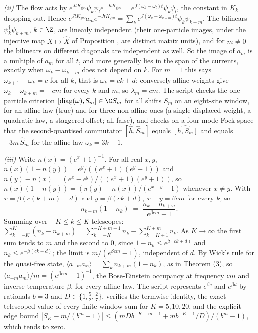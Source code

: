 \emph{(ii)} The flow acts by $e^{JtK_{\mathrm{geo}}}\psi_{k}^{\dagger}\psi_{l}e^{-JtK_{\mathrm{geo}}} = e^{J(\omega_{k} - \omega_{l})t}\psi_{k}^{\dagger}\psi_{l}$, the constant in $K_{k}$ dropping out. Hence $e^{JtK_{\mathrm{geo}}}a_{m}e^{-JtK_{\mathrm{geo}}} = \sum_{k}e^{J(\omega_{k} - \omega_{k+m})t}\psi_{k}^{\dagger}\psi_{k+m}$. The bilinears $\psi_{k}^{\dagger}\psi_{k+m}$, $k \in \Z$, are linearly independent (their one-particle images, under the injective map $X \mapsto \hat{X}$ of Proposition , are distinct matrix units), and for $m \neq 0$ the bilinears on different diagonals are independent as well. So the image of $a_{m}$ is a multiple of $a_{m}$ for all $t$, and more generally lies in the span of the currents, exactly when $\omega_{k} - \omega_{k+m}$ does not depend on $k$. For $m = 1$ this says $\omega_{k+1} - \omega_{k} = c$ for all $k$, that is $\omega_{k} = ck + d$; conversely affine weights give $\omega_{k} - \omega_{k+m} = -cm$ for every $k$ and $m$, so $\lambda_{m} = cm$. The script checks the one-particle criterion $[\operatorname{diag}(\omega), S_{m}] \in \C S_{m}$ for all shifts $S_{m}$ on an eight-site window, for an affine law (true) and for three non-affine ones (a single displaced weight, a quadratic law, a staggered offset; all false), and checks on a four-mode Fock space that the second-quantised commutator $[\hat{h}, \hat{S}_{m}]$ equals $\widehat{[h, S_{m}]}$ and equals $-3m\,\hat{S}_{m}$ for the affine law $\omega_{k} = 3k - 1$.

\emph{(iii)} Write $n(x) = (e^{x} + 1)^{-1}$. For all real $x, y$, $n(x)(1 - n(y)) = e^{y}/((e^{x} + 1)(e^{y} + 1))$ and $n(y) - n(x) = (e^{x} - e^{y})/((e^{x} + 1)(e^{y} + 1))$, so $n(x)(1 - n(y)) = (n(y) - n(x))/(e^{x - y} - 1)$ whenever $x \neq y$. With $x = \beta(c(k + m) + d)$ and $y = \beta(ck + d)$, $x - y = \beta cm$ for every $k$, so
\[
n_{k+m}(1 - n_{k}) \;=\; \frac{n_{k} - n_{k+m}}{e^{\beta cm} - 1} .
\]
Summing over $-K \le k \le K$ telescopes: $\sum_{k=-K}^{K}(n_{k} - n_{k+m}) = \sum_{k=-K}^{-K+m-1}n_{k} - \sum_{k=K+1}^{K+m}n_{k}$. As $K \to \infty$ the first sum tends to $m$ and the second to $0$, since $1 - n_{k} \le e^{\beta(ck + d)}$ and $n_{k} \le e^{-\beta(ck + d)}$; the limit is $m/(e^{\beta cm} - 1)$, independent of $d$. By Wick's rule for the quasi-free state, $\langle a_{-m}a_{m}\rangle = \sum_{k}n_{k+m}(1 - n_{k})$, as in Theorem (3), so $\langle a_{-m}a_{m}\rangle/m = (e^{\beta cm} - 1)^{-1}$, the Bose-Einstein occupancy at frequency $cm$ and inverse temperature $\beta$, for every affine law. The script represents $e^{\beta c}$ and $e^{\beta d}$ by rationals $b = 3$ and $D \in \{1, \tfrac52, \tfrac27\}$, verifies the termwise identity, the exact telescoped value of every finite-window sum for $K = 5, 10, 20$, and the explicit edge bound $|S_{K} - m/(b^{m} - 1)| \le (mDb^{-K+m-1} + mb^{-K-1}/D)/(b^{m} - 1)$, which tends to zero.

